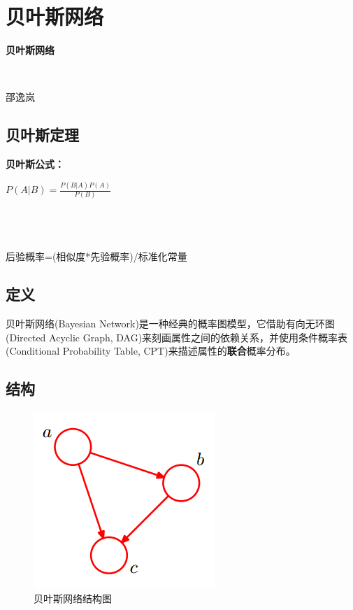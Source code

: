 \section*{贝叶斯网络}

\begin{frame}
\centerline{\textbf{\Large{贝叶斯网络}}} 
~\\
\centerline{\large{邵逸岚}}
\end{frame}

\subsection*{贝叶斯定理}
\begin{frame}
	\textbf{贝叶斯公式：}
	~\\
	\centerline{{\large $P(A|B)=\frac{P(B|A)P(A)}{P(B)}$}}
	~\\
	~\\
	~\\
	后验概率=(相似度*先验概率)/标准化常量 
\end{frame}

\subsection*{定义}
\begin{frame}
	贝叶斯网络(Bayesian Network)是一种经典的概率图模型，它借助有向无环图(Directed Acyclic Graph, DAG)来刻画属性之间的依赖关系，并使用条件概率表(Conditional Probability Table, CPT)来描述属性的\textbf{联合}概率分布。
\end{frame}

\subsection*{结构}
\begin{frame}
	\begin{figure}
		\centering
		\includegraphics[scale=0.5]{pic/bn.png}
		\caption{贝叶斯网络结构图}
		\label{0-002}
	\end{figure}
\end{frame}


